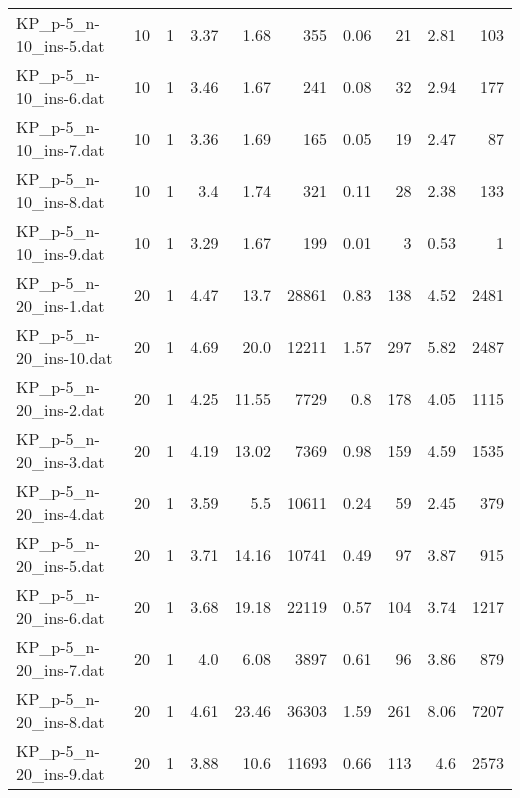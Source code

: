 \begin{center}
\begin{scriptsize}
\begin{longtable}{lrrrrrrrrr}
KP\_p-5\_n-10\_ins-5.dat & 10 & 1 & 3.37 & 1.68 & 355 & 0.06 & 21 & 2.81 & 103\\
KP\_p-5\_n-10\_ins-6.dat & 10 & 1 & 3.46 & 1.67 & 241 & 0.08 & 32 & 2.94 & 177\\
KP\_p-5\_n-10\_ins-7.dat & 10 & 1 & 3.36 & 1.69 & 165 & 0.05 & 19 & 2.47 & 87\\
KP\_p-5\_n-10\_ins-8.dat & 10 & 1 & 3.4 & 1.74 & 321 & 0.11 & 28 & 2.38 & 133\\
KP\_p-5\_n-10\_ins-9.dat & 10 & 1 & 3.29 & 1.67 & 199 & 0.01 & 3 & 0.53 & 1\\
KP\_p-5\_n-20\_ins-1.dat & 20 & 1 & 4.47 & 13.7 & 28861 & 0.83 & 138 & 4.52 & 2481\\
KP\_p-5\_n-20\_ins-10.dat & 20 & 1 & 4.69 & 20.0 & 12211 & 1.57 & 297 & 5.82 & 2487\\
KP\_p-5\_n-20\_ins-2.dat & 20 & 1 & 4.25 & 11.55 & 7729 & 0.8 & 178 & 4.05 & 1115\\
KP\_p-5\_n-20\_ins-3.dat & 20 & 1 & 4.19 & 13.02 & 7369 & 0.98 & 159 & 4.59 & 1535\\
KP\_p-5\_n-20\_ins-4.dat & 20 & 1 & 3.59 & 5.5 & 10611 & 0.24 & 59 & 2.45 & 379\\
KP\_p-5\_n-20\_ins-5.dat & 20 & 1 & 3.71 & 14.16 & 10741 & 0.49 & 97 & 3.87 & 915\\
KP\_p-5\_n-20\_ins-6.dat & 20 & 1 & 3.68 & 19.18 & 22119 & 0.57 & 104 & 3.74 & 1217\\
KP\_p-5\_n-20\_ins-7.dat & 20 & 1 & 4.0 & 6.08 & 3897 & 0.61 & 96 & 3.86 & 879\\
KP\_p-5\_n-20\_ins-8.dat & 20 & 1 & 4.61 & 23.46 & 36303 & 1.59 & 261 & 8.06 & 7207\\
KP\_p-5\_n-20\_ins-9.dat & 20 & 1 & 3.88 & 10.6 & 11693 & 0.66 & 113 & 4.6 & 2573\\
\bottomrule
\end{longtable}
\end{scriptsize}
\end{center}

